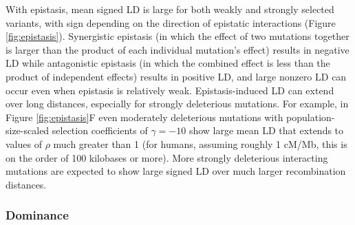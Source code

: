 \documentclass[]{article}
\begin{document}
With epistasis, mean signed LD is large for both weakly and strongly selected
variants, with sign depending on the direction of epistatic interactions
(Figure \ref{fig:epistasis}).
Synergistic epistasis (in which the effect of two mutations together is larger than
the product of each individual mutation's effect) results in negative LD while
antagonistic epistasis (in which the combined effect is less than the product of
independent effects) results in positive LD, and large nonzero LD can occur
even when epistasis is relatively weak. Epistasis-induced LD can
extend over long distances, especially for strongly deleterious mutations. For
example, in Figure \ref{fig:epistasis}F even moderately deleterious mutations with
population-size-scaled selection coefficients of \(\gamma=-10\) show large mean
LD that extends to values of \(\rho\) much greater than 1 (for humans, assuming
roughly 1 cM/Mb, this is on the order of 100 kilobases or more).
More strongly deleterious interacting mutations are expected to show large
signed LD over much larger recombination distances.

\subsubsection{Dominance}\label{sec:dominance}
\end{document}
